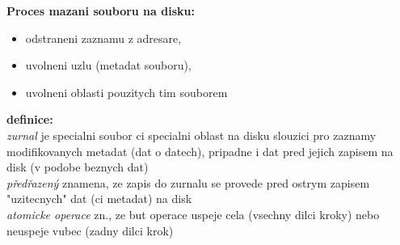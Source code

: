 \documentclass[a4paper, 11pt]{article}
\begin{document}
\textbf{Proces mazani souboru na disku:}
\begin{itemize}
    \item odstraneni zaznamu z adresare,
    \item uvolneni uzlu (metadat souboru),
    \item uvolneni oblasti pouzitych tim souborem \\
\end{itemize}

\noindent\textbf{definice:} \\[0.5em]
\textit{zurnal} je specialni soubor ci specialni oblast na disku slouzici pro zaznamy modifikovanych metadat (dat o datech), pripadne i dat pred jejich zapisem na disk (v podobe beznych dat) \\[0.2em]
\textit{p\v{r}ed\v{r}azen\'{y}} znamena, ze zapis do zurnalu se provede pred ostrym zapisem "uzitecnych" dat (ci metadat) na disk \\[0.2em]
\textit{atomicke operace} zn., ze but operace uspeje cela (vsechny dilci kroky) nebo neuspeje vubec (zadny dilci krok) \\
\end{document}
